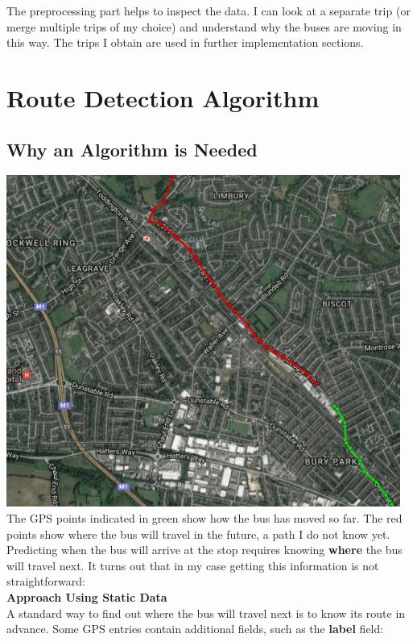 \documentclass[12pt,a4paper,oneside,openright]{report}
\begin{document}
The preprocessing part helps to inspect the data. I can look at a separate trip (or merge 
multiple trips of my choice) and understand why the buses are moving in this way.
The trips I obtain are used in further implementation sections.

\section{Route Detection Algorithm}

\subsection{Why an Algorithm is Needed}

\includegraphics[scale=0.8]{figs/route_detector.png} \\

The GPS points indicated in green show how the bus has moved so far.
The red points show where the bus will travel in the future,
a path I do not know yet. Predicting when the bus will arrive at the stop
requires knowing \textbf{where} the bus will travel next. It turns out that
in my case getting this information is not straightforward: \\

\textbf{Approach Using Static Data} \\

A standard way to find out where the bus will travel next is to know its 
route in advance. Some GPS entries contain additional fields,
such as the \textbf{label} field:
\end{document}
